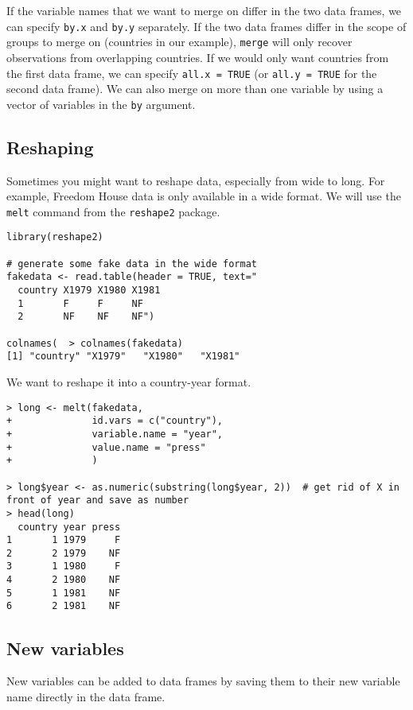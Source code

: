 If the variable names that we want to merge on differ in the two data frames, we can specify \texttt{by.x} and \texttt{by.y} separately. If the two data frames differ in the scope of groups to merge on (countries in our example), \texttt{merge} will only recover observations from overlapping countries. If we would only want countries from the first data frame, we can specify \verb|all.x = TRUE| (or \verb|all.y = TRUE| for the second data frame). We can also merge on more than one variable by using a vector of variables in the \texttt{by} argument.

\subsection{Reshaping}

Sometimes you might want to reshape data, especially from wide to long. For example, Freedom House data is only available in a wide format. We will use the \texttt{melt} command from the \texttt{reshape2} package.

\begin{lstlisting}
library(reshape2)

# generate some fake data in the wide format
fakedata <- read.table(header = TRUE, text="
  country X1979 X1980 X1981
  1       F     F     NF
  2       NF    NF    NF")
  
colnames(  > colnames(fakedata)
[1] "country" "X1979"   "X1980"   "X1981" 
\end{lstlisting}

We want to reshape it into a country-year format.

\begin{lstlisting}
> long <- melt(fakedata,
+              id.vars = c("country"),
+              variable.name = "year",
+              value.name = "press"
+              )

> long$year <- as.numeric(substring(long$year, 2))  # get rid of X in front of year and save as number
> head(long)
  country year press
1       1 1979     F
2       2 1979    NF
3       1 1980     F
4       2 1980    NF
5       1 1981    NF
6       2 1981    NF
\end{lstlisting}

\subsection{New variables}

New variables can be added to data frames by saving them to their new variable name directly in the data frame.

